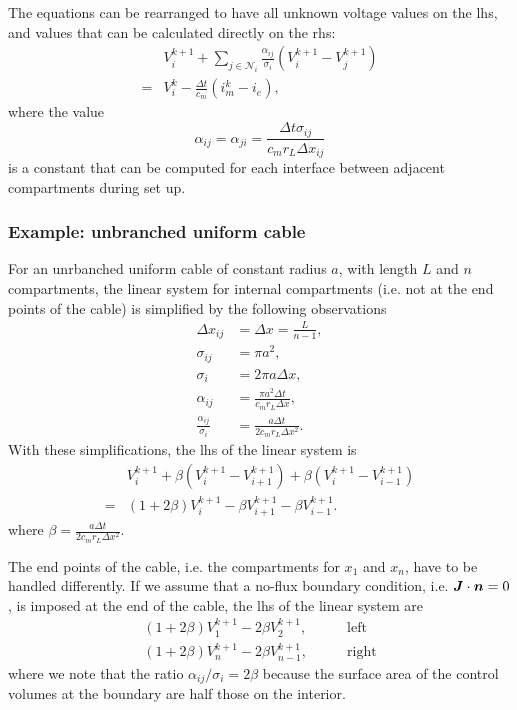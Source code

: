 The equations can be rearranged to have all unknown voltage values on the lhs, and values that can be calculated directly on the rhs:
\begin{align}
      & V_i^{k+1} + \sum_{j\in\mathcal{N}_i} {\frac{\alpha_{ij}}{\sigma_i} (V_i^{k+1}-V_j^{k+1})}
            \nonumber \\
    = & V_i^k - \frac{\Delta t}{c_m}(i_m^{k} - i_e),
    \label{eq:ode_linsys}
\end{align}
where the value
\begin{equation}
    \alpha_{ij} = \alpha_{ji} = \frac{\Delta t \sigma_{ij}}{ c_m r_L \Delta x_{ij}}
    \label{eq:alpha_linsys}
\end{equation}
is a constant that can be computed for each interface between adjacent compartments during set up.

\subsubsection{Example: unbranched uniform cable}
For an unrbanched uniform cable of constant radius $a$, with length $L$ and $n$ compartments, the linear system for internal compartments (i.e. not at the end points of the cable) is simplified by the following observations
\begin{align}
    \Delta x_{ij} &= \Delta x = \frac{L}{n-1}, \nonumber \\
    \sigma_{ij}   &= \pi a^2, \nonumber \\
    \sigma_{i}    &= 2 \pi a \Delta x, \nonumber \\
    \alpha_{ij}   &= \frac{\pi a^2\Delta t}{c_m r_L\Delta x}, \nonumber \\
    \frac{\alpha_{ij}}{\sigma_i}
                  &= \frac{a\Delta t}{2c_m r_L\Delta x^2}. \nonumber
\end{align}
With these simplifications, the lhs of the linear system is
\begin{align}
    & V_i^{k+1} + \beta (V_i^{k+1}-V_{i+1}^{k+1}) + \beta (V_i^{k+1}-V_{i-1}^{k+1})
            \nonumber \\
            = & (1+2\beta)V_i^{k+1} - \beta V_{i+1}^{k+1} - \beta V_{i-1}^{k+1}.
\end{align}
where $\beta=\frac{a\Delta t}{2c_m r_L\Delta x^2}$.

The end points of the cable, i.e. the compartments for $x_1$ and $x_n$, have to be handled differently.
If we assume that a no-flux boundary condition, i.e. $\bm{J}\cdot\bm{n}=0$, is imposed at the end of the cable, the lhs of the linear system are
\begin{align}
    (1+2\beta)V_1^{k+1} - 2\beta V_{2}^{k+1}, \quad\quad & \text{left} \nonumber \\
    (1+2\beta)V_n^{k+1} - 2\beta V_{n-1}^{k+1}, \quad\quad & \text{right} \nonumber
\end{align}
where we note that the ratio $\alpha_{ij}/\sigma_{i}=2\beta$ because the surface area of the control volumes at the boundary are half those on the interior.

